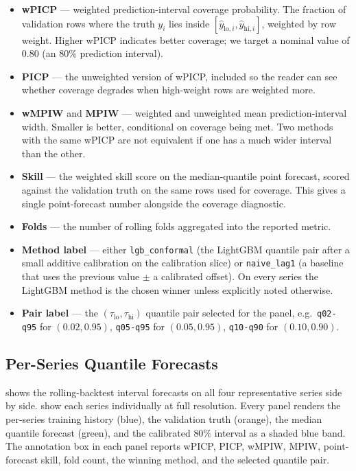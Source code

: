 \begin{itemize}
  \item \textbf{wPICP} --- weighted prediction-interval coverage probability. The fraction of validation rows where the truth $y_i$ lies inside $[\hat y_{\text{lo}, i}, \hat y_{\text{hi}, i}]$, weighted by row weight. Higher wPICP indicates better coverage; we target a nominal value of $0.80$ (an 80\% prediction interval).
  \item \textbf{PICP} --- the unweighted version of wPICP, included so the reader can see whether coverage degrades when high-weight rows are weighted more.
  \item \textbf{wMPIW} and \textbf{MPIW} --- weighted and unweighted mean prediction-interval width. Smaller is better, conditional on coverage being met. Two methods with the same wPICP are not equivalent if one has a much wider interval than the other.
  \item \textbf{Skill} --- the weighted skill score on the median-quantile point forecast, scored against the validation truth on the same rows used for coverage. This gives a single point-forecast number alongside the coverage diagnostic.
  \item \textbf{Folds} --- the number of rolling folds aggregated into the reported metric.
  \item \textbf{Method label} --- either \texttt{lgb\_conformal} (the LightGBM quantile pair after a small additive calibration on the calibration slice) or \texttt{naive\_lag1} (a baseline that uses the previous value $\pm$ a calibrated offset). On every series the LightGBM method is the chosen winner unless explicitly noted otherwise.
  \item \textbf{Pair label} --- the $(\tau_{\text{lo}}, \tau_{\text{hi}})$ quantile pair selected for the panel, e.g.\ \texttt{q02-q95} for $(0.02, 0.95)$, \texttt{q05-q95} for $(0.05, 0.95)$, \texttt{q10-q90} for $(0.10, 0.90)$.
\end{itemize}

\subsection{Per-Series Quantile Forecasts}
\label{sec:quantile:panels}

 shows the rolling-backtest interval forecasts on all four representative series side by side.  show each series individually at full resolution. Every panel renders the per-series training history (blue), the validation truth (orange), the median quantile forecast (green), and the calibrated $80\%$ interval as a shaded blue band. The annotation box in each panel reports wPICP, PICP, wMPIW, MPIW, point-forecast skill, fold count, the winning method, and the selected quantile pair.

